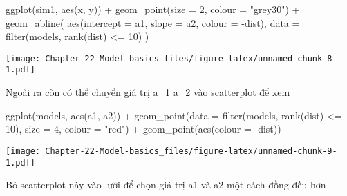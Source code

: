 \documentclass[
]{article}
\newenvironment{Shaded}{\begin{snugshade}}{\end{snugshade}}
\newcommand{\AttributeTok}[1]{\textcolor[rgb]{0.77,0.63,0.00}{#1}}
\newcommand{\DecValTok}[1]{\textcolor[rgb]{0.00,0.00,0.81}{#1}}
\newcommand{\FunctionTok}[1]{\textcolor[rgb]{0.00,0.00,0.00}{#1}}
\newcommand{\NormalTok}[1]{#1}
\newcommand{\SpecialCharTok}[1]{\textcolor[rgb]{0.00,0.00,0.00}{#1}}
\newcommand{\StringTok}[1]{\textcolor[rgb]{0.31,0.60,0.02}{#1}}
\begin{document}
\begin{Shaded}
\begin{Highlighting}[]
\FunctionTok{ggplot}\NormalTok{(sim1, }\FunctionTok{aes}\NormalTok{(x, y)) }\SpecialCharTok{+} 
  \FunctionTok{geom\_point}\NormalTok{(}\AttributeTok{size =} \DecValTok{2}\NormalTok{, }\AttributeTok{colour =} \StringTok{"grey30"}\NormalTok{) }\SpecialCharTok{+} 
  \FunctionTok{geom\_abline}\NormalTok{(}
    \FunctionTok{aes}\NormalTok{(}\AttributeTok{intercept =}\NormalTok{ a1, }\AttributeTok{slope =}\NormalTok{ a2, }\AttributeTok{colour =} \SpecialCharTok{{-}}\NormalTok{dist), }
    \AttributeTok{data =} \FunctionTok{filter}\NormalTok{(models, }\FunctionTok{rank}\NormalTok{(dist) }\SpecialCharTok{\textless{}=} \DecValTok{10}\NormalTok{)}
\NormalTok{  )}
\end{Highlighting}
\end{Shaded}

\texttt{[image: Chapter-22-Model-basics\_files/figure-latex/unnamed-chunk-8-1.pdf]}

Ngoài ra còn có thể chuyển giá trị a\_1 a\_2 vào scatterplot để xem

\begin{Shaded}
\begin{Highlighting}[]
\FunctionTok{ggplot}\NormalTok{(models, }\FunctionTok{aes}\NormalTok{(a1, a2)) }\SpecialCharTok{+}
  \FunctionTok{geom\_point}\NormalTok{(}\AttributeTok{data =} \FunctionTok{filter}\NormalTok{(models, }\FunctionTok{rank}\NormalTok{(dist) }\SpecialCharTok{\textless{}=} \DecValTok{10}\NormalTok{), }\AttributeTok{size =} \DecValTok{4}\NormalTok{, }\AttributeTok{colour =} \StringTok{"red"}\NormalTok{) }\SpecialCharTok{+}
  \FunctionTok{geom\_point}\NormalTok{(}\FunctionTok{aes}\NormalTok{(}\AttributeTok{colour =} \SpecialCharTok{{-}}\NormalTok{dist))}
\end{Highlighting}
\end{Shaded}

\texttt{[image: Chapter-22-Model-basics\_files/figure-latex/unnamed-chunk-9-1.pdf]}

Bỏ scatterplot này vào lưới để chọn giá trị a1 và a2 một cách đồng đều
hơn
\end{document}
